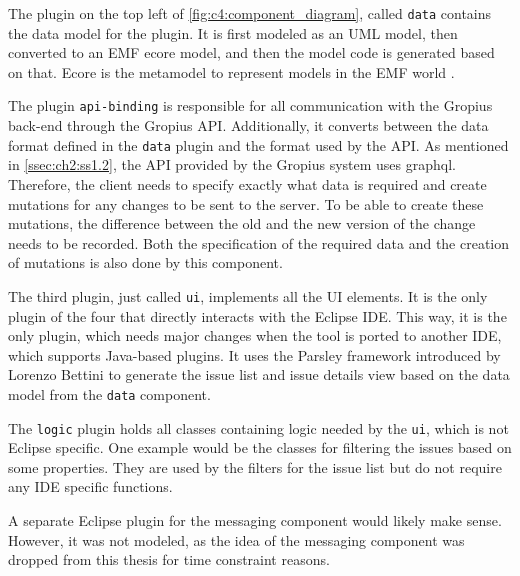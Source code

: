 The plugin on the top left of \cref{fig:c4:component_diagram}, called \lstinline|data| contains the data model for the plugin. 
It is first modeled as an \gls{UML} model, then converted to an \gls{EMF} ecore model, and then the model code is generated based on that.
Ecore is the metamodel to represent models in the \gls{EMF} world \cite{steinberg2008emf}.

The plugin \lstinline|api-binding| is responsible for all communication with the \gls{Gropius} back-end through the \gls{Gropius} \gls{API}.
Additionally, it converts between the data format defined in the \lstinline|data| plugin and the format used by the \gls{API}.
As mentioned in \cref{ssec:ch2:ss1.2}, the \gls{API} provided by the Gropius system uses \gls{graphql}.
Therefore, the client needs to specify exactly what data is required and create mutations for any changes to be sent to the server.
To be able to create these mutations, the difference between the old and the new version of the change needs to be recorded.
Both the specification of the required data and the creation of mutations is also done by this component.

The third plugin, just called \lstinline|ui|, implements all the \gls{UI} elements.
It is the only plugin of the four that directly interacts with the \gls{Eclipse} \gls{IDE}.
This way, it is the only plugin, which needs major changes when the tool is ported to another \gls{IDE}, which supports Java-based plugins.
It uses the \gls{Parsley} framework introduced by Lorenzo Bettini \cite{bettini2014developing} to generate the issue list and issue details view 
based on the data model from the \lstinline|data| component.

The \lstinline|logic| plugin holds all classes containing logic needed by the \lstinline|ui|, which is not \gls{Eclipse} specific.
One example would be the classes for filtering the issues based on some properties.
They are used by the filters for the issue list but do not require any \gls{IDE} specific functions.

A separate \gls{Eclipse} plugin for the messaging component would likely make sense.
However, it was not modeled, as the idea of the messaging component was dropped from this thesis for time constraint reasons.

